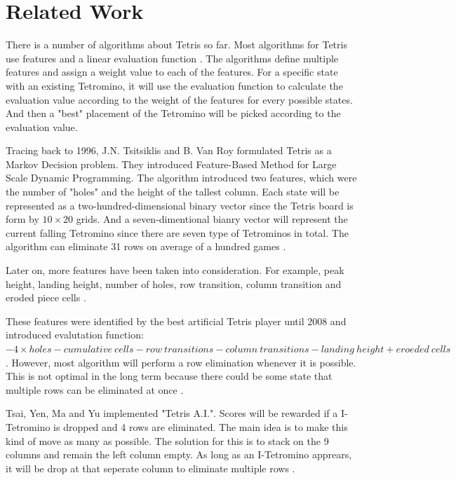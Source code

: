 \documentclass[letterpaper]{article} %
\begin{document}

\section{Related Work} 

There is a number of algorithms about Tetris so far. Most algorithms for Tetris use features and a linear evaluation function \cite{SO19}. The algorithms define multiple features and assign a weight value to each of the features. For a specific state with an existing Tetromino, it will use the evaluation function to calculate the evaluation value according to the weight of the features for every possible states. And then a "best" placement of the Tetromino will be picked according to the evaluation value.

Tracing back to 1996, J.N. Tsitsiklis and B. Van Roy formulated Tetris as a Markov Decision problem. They introduced Feature-Based Method for Large Scale Dynamic Programming. The algorithm introduced two features, which were the number of "holes" and the height of the tallest column. Each state will be represented as a two-hundred-dimensional binary vector since the Tetris board is form by $10 \times 20$ grids. And a seven-dimentional bianry vector will represent the current falling Tetromino since there are seven type of Tetrominos in total. The algorithm can eliminate 31 rows on average of a hundred games \cite{TV96}.

Later on, more features have been taken into consideration. For example, peak height, landing height, number of holes, row transition, column transition and eroded piece cells \cite{WCWT}. 

These features were identified by the best artificial Tetris player until 2008 and introduced evalutation function: 
$-4 \times holes - cumulative\ cells - row\ transitions - column\ transitions - landing\ height + eroeded\ cells$ \cite{SO19}. However, most algorithm will perform a row elimination whenever it is possible. This is not optimal in the long term because there could be some state that multiple rows can be eliminated at once \cite{WCWT}. 

Tsai, Yen, Ma and Yu implemented "Tetris A.I.". Scores will be rewarded if a I-Tetromino is dropped and 4 rows are eliminated. The main idea is to make this kind of move as many as possible. The solution for this is to stack on the 9 columns and remain the left column empty. As long as an I-Tetromino apprears, it will be drop at that seperate column to eliminate multiple rows \cite{WCWT}.
\end{document}

